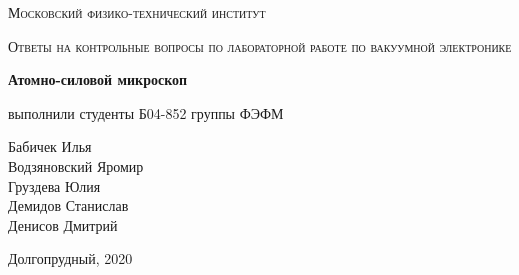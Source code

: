 \documentclass[a4paper]{article}
\begin{document}
\begin{titlepage}
	\centering
	\vspace{5cm}
    {\scshape\LARGE Московский физико-технический институт\par}
    

	\vspace{8cm}
	{\scshape\Large Ответы на контрольные вопросы по лабораторной работе по вакуумной электронике  \par}
	\vspace{2cm}
    {\huge\bfseries  Атомно-силовой микроскоп  \par}
	\vspace{4cm}
	\vfill
\begin{flushright}
	{\large выполнили студенты Б04-852 группы ФЭФМ}\par
	\vspace{0.3cm}
    {\LARGE Бабичек Илья}\\
    \vspace{0.1cm}
    {\LARGE Водзяновский Яромир}\\
    \vspace{0.1cm}
	{\LARGE Груздева Юлия}\\
    \vspace{0.1cm}
    {\LARGE Демидов Станислав}\\
    \vspace{0.1cm}
	{\LARGE Денисов Дмитрий}\\
\end{flushright}
	
	\vfill
Долгопрудный, 2020
\end{titlepage}
\end{document}
